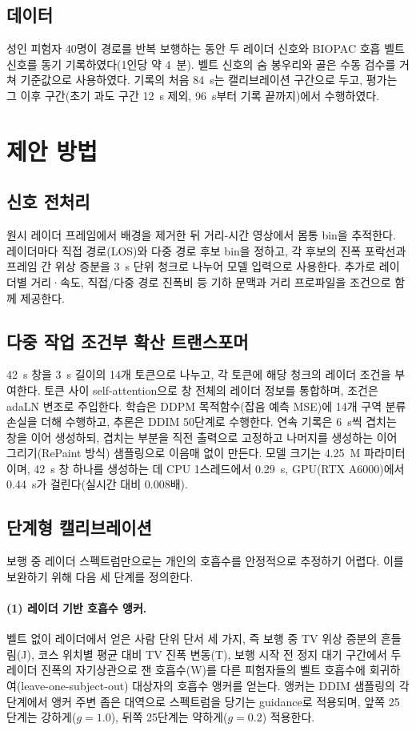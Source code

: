\documentclass{article}
\begin{document}
\subsection{데이터}
성인 피험자 40명이 경로를 반복 보행하는 동안 두 레이더 신호와 BIOPAC 호흡 벨트 신호를 동기 기록하였다(1인당 약 4~분).
벨트 신호의 숨 봉우리와 골은 수동 검수를 거쳐 기준값으로 사용하였다.
기록의 처음 84~s는 캘리브레이션 구간으로 두고, 평가는 그 이후 구간(초기 과도 구간 12~s 제외, 96~s부터 기록 끝까지)에서 수행하였다.

\section{제안 방법}
\subsection{신호 전처리}
원시 레이더 프레임에서 배경을 제거한 뒤 거리-시간 영상에서 몸통 bin을 추적한다.
레이더마다 직접 경로(LOS)와 다중 경로 후보 bin을 정하고, 각 후보의 진폭 포락선과 프레임 간 위상 증분을 3~s 단위 청크로 나누어 모델 입력으로 사용한다.
추가로 레이더별 거리·속도, 직접/다중 경로 진폭비 등 기하 문맥과 거리 프로파일을 조건으로 함께 제공한다.

\subsection{다중 작업 조건부 확산 트랜스포머}
42~s 창을 3~s 길이의 14개 토큰으로 나누고, 각 토큰에 해당 청크의 레이더 조건을 부여한다.
토큰 사이 self-attention으로 창 전체의 레이더 정보를 통합하며, 조건은 adaLN 변조로 주입한다.
학습은 DDPM 목적함수(잡음 예측 MSE)에 14개 구역 분류 손실을 더해 수행하고, 추론은 DDIM 50단계로 수행한다.
연속 기록은 6~s씩 겹치는 창을 이어 생성하되, 겹치는 부분을 직전 출력으로 고정하고 나머지를 생성하는 이어 그리기(RePaint 방식) 샘플링으로 이음매 없이 만든다.
모델 크기는 4.25~M 파라미터이며, 42~s 창 하나를 생성하는 데 CPU 1스레드에서 0.29~s, GPU(RTX A6000)에서 0.44~s가 걸린다(실시간 대비 0.008배).

\subsection{단계형 캘리브레이션}
보행 중 레이더 스펙트럼만으로는 개인의 호흡수를 안정적으로 추정하기 어렵다. 이를 보완하기 위해 다음 세 단계를 정의한다.

\paragraph{(1) 레이더 기반 호흡수 앵커.}
벨트 없이 레이더에서 얻은 사람 단위 단서 세 가지, 즉 보행 중 TV 위상 증분의 흔들림(J), 코스 위치별 평균 대비 TV 진폭 변동(T), 보행 시작 전 정지 대기 구간에서 두 레이더 진폭의 자기상관으로 잰 호흡수(W)를
다른 피험자들의 벨트 호흡수에 회귀하여(leave-one-subject-out) 대상자의 호흡수 앵커를 얻는다.
앵커는 DDIM 샘플링의 각 단계에서 앵커 주변 좁은 대역으로 스펙트럼을 당기는 guidance로 적용되며, 앞쪽 25단계는 강하게($g{=}1.0$), 뒤쪽 25단계는 약하게($g{=}0.2$) 적용한다.
\end{document}
